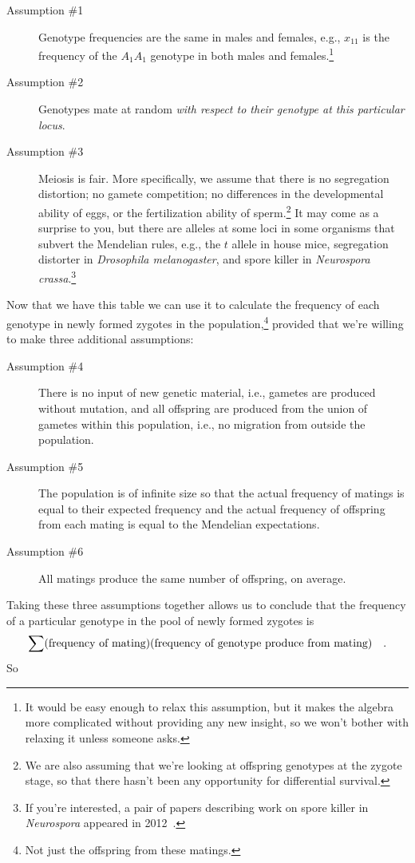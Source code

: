 \begin{description}

\item[Assumption \#1] Genotype frequencies are the same in males and
  females, e.g., $x_{11}$ is the frequency of the $A_1A_1$ genotype in
  both males and females.\footnote{It would be easy enough to relax
    this assumption, but it makes the algebra more complicated without
    providing any new insight, so we won't bother with relaxing it
    unless someone asks.}

\item[Assumption \#2] Genotypes mate at random {\it with respect to
  their genotype at this particular locus}.

\item[Assumption \#3] Meiosis is fair. More specifically, we assume
  that there is no segregation distortion; no gamete competition; no
  differences in the developmental ability of eggs, or the
  fertilization ability of sperm.\footnote{We are also assuming that
    we're looking at offspring genotypes at the zygote stage, so that
    there hasn't been any opportunity for differential survival.} It
  may come as a surprise to you, but there are alleles at some loci in
  some organisms that subvert the Mendelian rules, e.g., the $t$
  allele in house mice, segregation distorter in {\it Drosophila
    melanogaster}, and spore killer in {\it Neurospora
    crassa\/}.\footnote{If you're interested, a pair of papers
    describing work on spore killer in {\it Neurospora\/} appeared in
    2012~\cite{Hammond-etal-2012,Saupe-2012}.}

\end{description}
Now that we have this table we can use it to calculate the frequency
of each genotype in newly formed zygotes in the
population,\footnote{Not just the offspring from these matings.}
provided that we're willing to make three additional assumptions:

\begin{description}

\item[Assumption \#4] There is no input of new genetic material, i.e.,
gametes are produced without mutation, and all offspring are produced
from the union of gametes within this population, i.e., no migration
from outside the population.

\item[Assumption \#5] The population is of infinite size so that the
actual frequency of matings is equal to their expected frequency and
the actual frequency of offspring from each mating is equal to the
Mendelian expectations.

\item[Assumption \#6] All matings produce the same number of
offspring, on average.

\end{description}
Taking these three assumptions together allows us to conclude that the
frequency of a particular genotype in the pool of newly formed zygotes
is
\[
\sum(\hbox{frequency of mating})(\hbox{frequency of genotype produce
  from mating}) \quad .
\]
So


